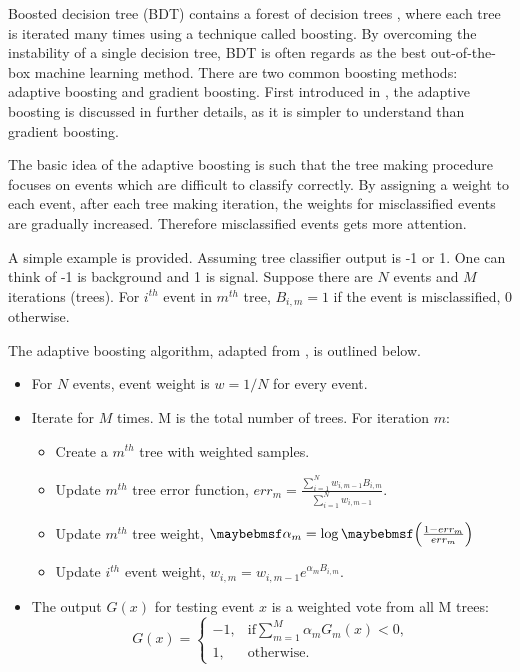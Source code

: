 Boosted decision tree (BDT) contains a forest of decision trees , where each tree is iterated many times using a technique called boosting.   By overcoming the instability of a single  decision tree, BDT is often regards as  the best out-of-the-box machine learning method. There are two common boosting methods: adaptive boosting and gradient boosting. First introduced in \cite{FREUND1997119}, the adaptive boosting is discussed in further details, as it is simpler to understand than gradient boosting.

The basic idea of the adaptive boosting is such that the tree making procedure focuses on events which are difficult to classify correctly. By assigning a weight to each event,   after each tree making iteration, the weights for misclassified events are gradually increased. Therefore misclassified events gets more attention.

A simple example is provided. Assuming tree classifier output is -1 or 1. One can think of -1 is background and 1 is signal. Suppose there are $N$ events and $M$ iterations (trees). For $i^{th}$ event in $m^{th}$ tree,  $B_{i,m} = 1$ if the event is misclassified, 0 otherwise.

The adaptive boosting algorithm, adapted from \cite{hastie2009elements},  is outlined below.

\begin{itemize}
  \item For $N$ events, event weight is $w = 1 / N$ for every event.
  \item Iterate for $M$ times. M is the total number of trees. For iteration $m$:
    \begin{itemize}
      \item Create a $m^{th}$ tree  with weighted samples.
      \item Update $m^{th}$ tree error function, $err_m = \frac{\sum_{i = 1}^{N} w_{i,m-1} B_{i,m} }{\sum_{i = 1}^{N}w_{i,m-1}}$.
      \item Update $m^{th}$ tree weight,  $\alpha_m = \log\parenths{\frac{1 - err_m}{err_m}}$
      \item Update $i^{th}$ event weight, $w_{i,m} = w_{i,m-1} e^{\alpha_m B_{i,m} }$.
    \end{itemize}
  \item The output $G(x)$ for testing event $x$ is a weighted vote from all M trees:
  \begin{equation}
    G(x)=
     \begin{cases}
      -1, & \mbox{if} \sum_{m=1}^{M}\alpha_mG_m(x) < 0 , \\
      1, & \mbox{otherwise}.
    \end{cases}
  \end{equation}
\end{itemize}

